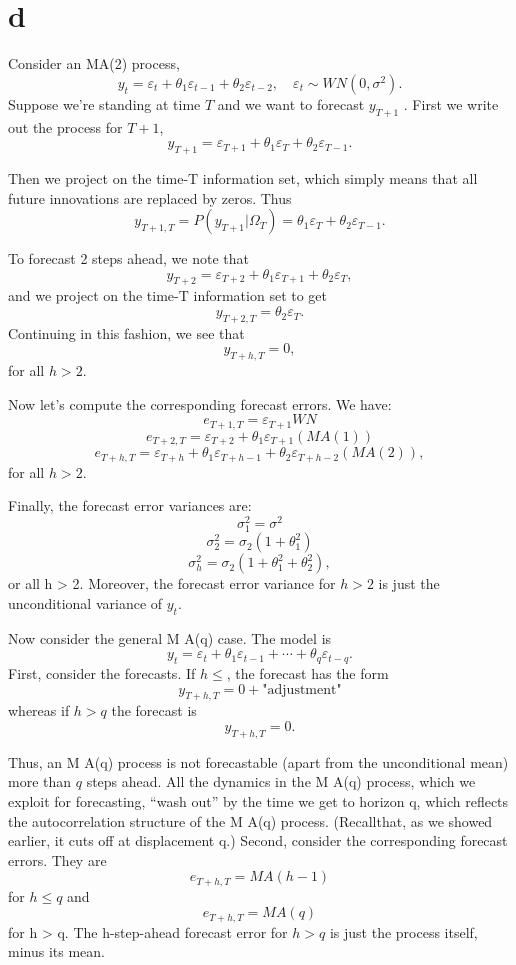 \documentclass[]{article}
\begin{document}
\hypertarget{d}{%
\section{d}\label{d}}

Consider an MA(2) process,
\[y_t = \varepsilon_t + \theta_1 \varepsilon_{t−1} + \theta_2 \varepsilon_{t−2},\quad \varepsilon_t ∼ W N (0, \sigma ^2 ).\]
Suppose we're standing at time \(T\) and we want to forecast
\(y_{T +1}\) . First we write out the process for \(T + 1\),
\[y_{T +1} = \varepsilon_{T +1} + \theta_1 \varepsilon _T + \theta_2 \varepsilon_{T −1} .\]

Then we project on the time-T information set, which simply means that
all future innovations are replaced by zeros. Thus
\[y_{ T +1,T} = P (y_{T +1} |\Omega_T ) = \theta_1 \varepsilon_T + \theta_2 \varepsilon_{T −1} .\]

To forecast 2 steps ahead, we note that
\[y_{T +2} = \varepsilon_{T +2} + \theta_1 \varepsilon_{T +1} + \theta _2 \varepsilon_T ,\]
and we project on the time-T information set to get
\[y_{T +2,T} = \theta_2 \varepsilon_T .\] Continuing in this fashion, we
see that \[y_{ T +h,T} = 0,\] for all \(h>2\).

Now let's compute the corresponding forecast errors. We have:
\[e_{T +1,T} = \varepsilon_{T +1} W N\]
\[e_{T +2,T} = \varepsilon _{T +2} + \theta_1 \varepsilon _{T +1}  (M A(1))\]
\[e_{ T +h,T} = \varepsilon_{T +h}  + \theta _1 \varepsilon_{T +h−1} + \theta_2 \varepsilon
_{T +h−2} (M A(2)),\] for all \(h>2\).

Finally, the forecast error variances are: \[\sigma_1^2 = \sigma^2\]
\[\sigma_2^2 = \sigma_2 (1 + \theta_1^2 )\]
\[\sigma_h^2  = \sigma_2 (1 + \theta_1^2 + \theta_2^2 ),\] or all h
\textgreater{} 2. Moreover, the forecast error variance for \(h>2\) is
just the unconditional variance of \(y_t\).

Now consider the general M A(q) case. The model is
\[y_t = \varepsilon_ t + \theta_ 1 \varepsilon_{t-1} + \cdots +\theta_ q \varepsilon_{t−q}.\]
First, consider the forecasts. If \(h\leq\), the forecast has the form
\[y_{ T +h,T} = 0 + \text{"adjustment"}\] whereas if \(h>q\) the
forecast is \[y_{ T +h,T} = 0.\]

Thus, an M A(q) process is not forecastable (apart from the
unconditional mean) more than \(q\) steps ahead. All the dynamics in the
M A(q) process, which we exploit for forecasting, ``wash out'' by the
time we get to horizon q, which reflects the autocorrelation structure
of the M A(q) process. (Recallthat, as we showed earlier, it cuts off at
displacement q.) Second, consider the corresponding forecast errors.
They are \[e_{ T +h,T} = M A(h − 1)\] for \(h \leq q\) and
\[e_{ T +h,T} = M A(q)\] for h \textgreater{} q. The h-step-ahead
forecast error for \(h > q\) is just the process itself, minus its mean.
\end{document}
